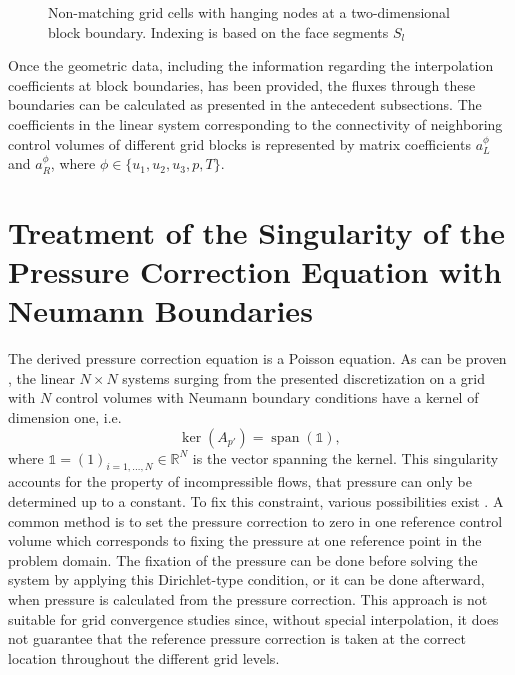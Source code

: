 \begin{figure}
  \centering
  
  \caption{Non-matching grid cells with hanging nodes at a two-dimensional block boundary. Indexing is based on the face segments $S_l$}
  \label{fig:nonmatching}
\end{figure}

Once the geometric data, including the information regarding the interpolation coefficients at block boundaries, has been provided, the fluxes through these boundaries can be calculated as presented in the antecedent subsections. The coefficients in the linear system corresponding to the connectivity of neighboring control volumes of different grid blocks is represented by matrix coefficients \(a_L^{\phi}\) and \(a_R^{\phi}\), where \(\phi \in \{u_1,u_2,u_3,p,T\}\).

\section{Treatment of the Singularity of the Pressure Correction Equation with Neumann Boundaries}
\label{sec:singularitytreatment}

The derived pressure correction equation is a Poisson equation. As can be proven \cite{hackbusch96}, the linear \(N \times N\) systems surging from the presented discretization on a grid with \(N\) control volumes with Neumann boundary conditions have a kernel of dimension one, i.e.
\begin{displaymath}
  \operatorname{ker}(A_{p'}) = \operatorname{span}(\mathbb{1}),
\end{displaymath}
where \(\mathbb{1} = (1)_{i = 1,\dots,N} \in \mathbb{R}^N\) is the vector spanning the kernel. This singularity accounts for the property of incompressible flows, that pressure can only be determined up to a constant. To fix this constraint, various possibilities exist \cite{ferziger02}. A common method is to set the pressure correction to zero in one reference control volume which corresponds to fixing the pressure at one reference point in the problem domain. The fixation of the pressure can be done before solving the system by applying this Dirichlet-type condition, or it can be done afterward, when pressure is calculated from the pressure correction. This approach is not suitable for grid convergence studies since, without special interpolation, it does not guarantee that the reference pressure correction is taken at the correct location throughout the different grid levels.

